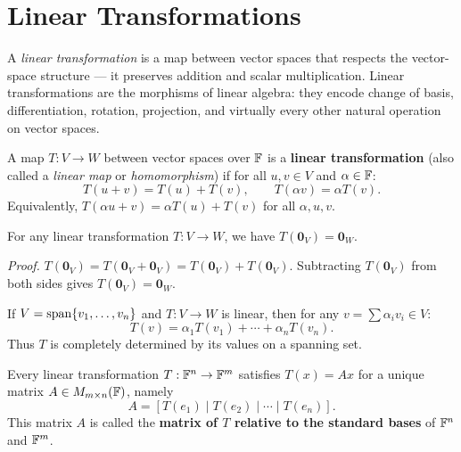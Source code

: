 \section{Linear Transformations}
\label{sec:lt}

A \emph{linear transformation} is a map between vector spaces that respects
the vector-space structure — it preserves addition and scalar multiplication.
Linear transformations are the morphisms of linear algebra: they encode change
of basis, differentiation, rotation, projection, and virtually every other
natural operation on vector spaces.

\begin{defbox}
\label{def:linear-transformation}
A map $T:V\to W$ between vector spaces over $\mathbb{F}$ is a
\textbf{linear transformation} (also called a \emph{linear map} or
\emph{homomorphism}) if for all $u,v\in V$ and $\alpha\in\mathbb{F}$:
\[
    T(u+v) = T(u)+T(v), \qquad T(\alpha v) = \alpha T(v).
\]
Equivalently, $T(\alpha u + v) = \alpha T(u)+T(v)$ for all $\alpha,u,v$.
\end{defbox}

\begin{tipbox}
\label{rem:lt-zero}
For any linear transformation $T:V\to W$, we have $T(\mathbf{0}_V)=\mathbf{0}_W$.

\textit{Proof.}
$T(\mathbf{0}_V) = T(\mathbf{0}_V + \mathbf{0}_V) = T(\mathbf{0}_V)+T(\mathbf{0}_V)$.
Subtracting $T(\mathbf{0}_V)$ from both sides gives $T(\mathbf{0}_V)=\mathbf{0}_W$.
\end{tipbox}

\begin{tipbox}
\label{rem:lt-span}
If $V=\operatorname{span}\{v_1,\ldots,v_n\}$ and $T:V\to W$ is linear, then for any
$v=\sum\alpha_i v_i\in V$:
\[
    T(v) = \alpha_1 T(v_1) + \cdots + \alpha_n T(v_n).
\]
Thus $T$ is completely determined by its values on a spanning set.
\end{tipbox}

\begin{propbox}
\label{prop:lt-matrix}
Every linear transformation $T:\mathbb{F}^n\to\mathbb{F}^m$ satisfies $T(x)=Ax$ for a
unique matrix $A\in M_{m\times n}(\mathbb{F})$, namely
\[
    A = [T(e_1)\mid T(e_2)\mid\cdots\mid T(e_n)].
\]
This matrix $A$ is called the \textbf{matrix of $T$ relative to the standard
bases} of $\mathbb{F}^n$ and $\mathbb{F}^m$.
\end{propbox}

